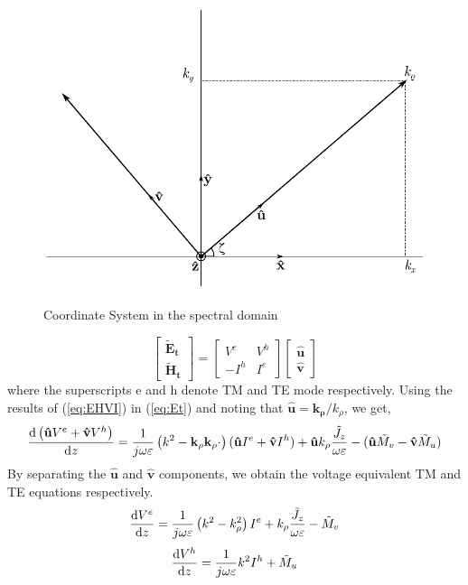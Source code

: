 \documentclass[11pt]{article}
\renewcommand{\v}[1]{\mathbf{#1}} %
\newcommand{\ti}[1]{\tilde{#1}} %
\renewcommand{\O}{\omega}  %
\newcommand{\E}{\varepsilon}  %
\newcommand{\p}{\rho}  %
\renewcommand{\^}{\hat}  %
\begin{document}
  \begin{figure}[t!]
    \centering
    {\includegraphics[scale=.75]{fig_coordinate.pdf}}
    \caption{Coordinate System in the spectral domain \cite[p. 1166]{michalski2005electromagnetic}}
    \label{fig:SpCS}
  \end{figure}

  \begin{equation}
    \left[\begin{array}{c}
    \v{\ti{E}_t} \\
    \v{\ti{H}_t}
    \end{array} \right]
    = \left[ \begin{array}{cc}
    V^e & V^h \\
    -I^h & I^e
    \end{array} \right]
    \left[\begin{array}{c}
    \v{\^u} \\
    \v{\^v}
    \end{array} \right]
    \label{eq:EHVI}
  \end{equation}
  where the superscripts e and h denote TM and TE mode respectively.
  Using the results of (\ref{eq:EHVI}) in (\ref{eq:Et}) and noting that $\v{\^u} = \v{k_{\p}}/k_{\p}$, we get,
  \begin{equation}
    \dv{\left(\v{\^u}V^e + \v{\^v}V^h \right)}{z} = \frac{1}{j \O \E}\left( k^2 - \v{k_{\p}}\v{k_{\p}} \cdot \right) (\v{\^u} I^e + \v{\^v}I^h) + \v{\^u}k_{\p} \frac{\ti{J}_z}{\O \E} - (\v{\^u} \ti{M}_v - \v{\^v} \ti{M}_u)
    \label{eq:Vinuv}
  \end{equation}
  By separating the $\v{\^u}$ and $\v{\^v}$ components, we obtain the voltage equivalent TM and TE equations respectively.
  \begin{equation}
    \dv{V^e}{z} = \frac{1}{j \O \E}\left( k^2 - k_{\p}^2 \right)I^e + k_{\p}\frac{\ti{J}_z}{\O \E} - \ti{M}_v
    \label{eq:V_TM}
  \end{equation}
  \begin{equation}
    \dv{V^h}{z} = \frac{1}{j \O \E}k^2 I^h + \ti{M}_u
    \label{eq:V_TE}
  \end{equation}
\end{document}
